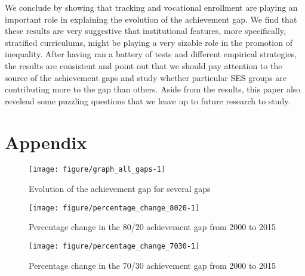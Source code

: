 \documentclass[11pt, a4paper]{article}\usepackage[]{graphicx}\usepackage[]{color}
\begin{document}
We conclude by showing that tracking and vocational enrollment are playing an important role in explaining the evolution of the achievement gap. We find that these results are very suggestive that institutional features, more specifically, stratified curriculums, might be playing a very sizable role in the promotion of inequality. After having ran a battery of tests and different empirical strategies, the results are consistent and point out that we should pay attention to the source of the achievement gaps and study whether particular SES groups are contributing more to the gap than others. Aside from the results, this paper also revelead some puzzling questions that we leave up to future research to study.



\pagebreak

\section{Appendix}

\begin{figure}[!htbp]

{\centering \texttt{[image: figure/graph\_all\_gaps-1]} 

}

\caption[Evolution of the achievement gap for several gaps]{Evolution of the achievement gap for several gaps}\label{fig:graph_all_gaps}
\end{figure}



\begin{figure}

{\centering \texttt{[image: figure/percentage\_change\_8020-1]} 

}

\caption[Percentage change in the 80/20 achievement gap from 2000 to 2015]{Percentage change in the 80/20 achievement gap from 2000 to 2015}\label{fig:percentage_change_8020}
\end{figure}



\begin{figure}

{\centering \texttt{[image: figure/percentage\_change\_7030-1]} 

}

\caption[Percentage change in the 70/30 achievement gap from 2000 to 2015]{Percentage change in the 70/30 achievement gap from 2000 to 2015}\label{fig:percentage_change_7030}
\end{figure}
\end{document}

